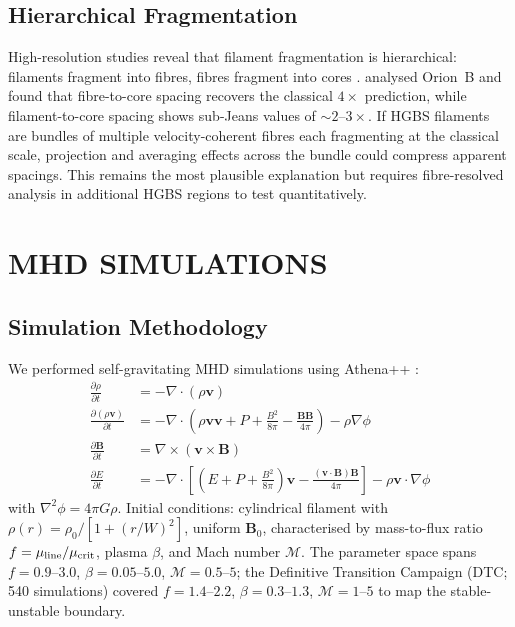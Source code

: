 \documentclass[twoside,twocolumn]{mnras}
\begin{document}
\subsection{Hierarchical Fragmentation}

High-resolution studies reveal that filament fragmentation is hierarchical: filaments
fragment into fibres, fibres fragment into cores \citep{Hacar2013, Hacar2018}.
\citet{Yang2024} analysed Orion~B and found that fibre-to-core spacing recovers the
classical $4\times$ prediction, while filament-to-core spacing shows sub-Jeans values
of ${\sim}2$--$3\times$. If HGBS filaments are bundles of multiple velocity-coherent
fibres each fragmenting at the classical scale, projection and averaging effects across
the bundle could compress apparent spacings. This remains the most plausible explanation
but requires fibre-resolved analysis in additional HGBS regions to test quantitatively.

\section{MHD SIMULATIONS}

\subsection{Simulation Methodology}

We performed self-gravitating MHD simulations using Athena++ \citep{Stone2020}:
\begin{align}
\frac{\partial \rho}{\partial t} &= -\nabla \cdot (\rho \mathbf{v}) \\
\frac{\partial (\rho \mathbf{v})}{\partial t} &= -\nabla \cdot \left(\rho \mathbf{v} \mathbf{v} + P + \frac{B^2}{8\pi} - \frac{\mathbf{B}\mathbf{B}}{4\pi}\right) - \rho \nabla \phi \\
\frac{\partial \mathbf{B}}{\partial t} &= \nabla \times (\mathbf{v} \times \mathbf{B}) \\
\frac{\partial E}{\partial t} &= -\nabla \cdot \left[\left(E + P + \frac{B^2}{8\pi}\right)\mathbf{v} - \frac{(\mathbf{v} \cdot \mathbf{B})\mathbf{B}}{4\pi}\right] - \rho \mathbf{v} \cdot \nabla \phi
\end{align}
with $\nabla^2 \phi = 4\pi G\rho$. Initial conditions: cylindrical filament with
$\rho(r) = \rho_0 / [1 + (r/W)^2]$, uniform $\mathbf{B}_0$, characterised by
mass-to-flux ratio $f = \mu_{\rm line}/\mu_{\rm crit}$, plasma $\beta$, and
Mach number $\mathcal{M}$. The parameter space spans $f = 0.9$--$3.0$,
$\beta = 0.05$--$5.0$, $\mathcal{M} = 0.5$--$5$; the Definitive Transition Campaign
(DTC; 540 simulations) covered $f = 1.4$--$2.2$, $\beta = 0.3$--$1.3$,
$\mathcal{M} = 1$--$5$ to map the stable-unstable boundary.
\end{document}
